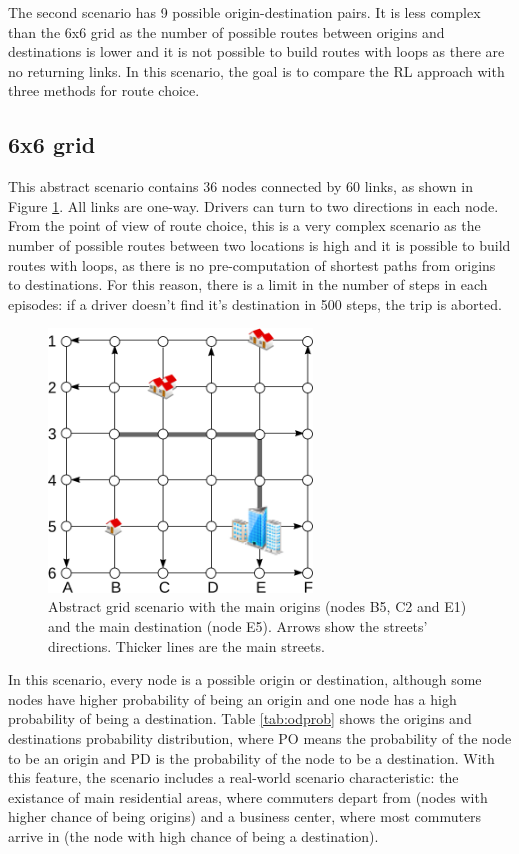 \documentclass{RITA}
\begin{document}
The second scenario has 9 possible origin-destination pairs. It is less complex than the 6x6 grid as the number of possible routes between origins and destinations is lower and it is not possible to build routes with loops as there are no returning links. In this scenario, the goal is to compare the RL approach with three methods for route choice.

\subsection{6x6 grid}

This abstract scenario contains 36 nodes connected by 60 links, as shown in Figure \ref{fig:6x6grid}. All links are one-way. Drivers can turn to two directions in each node. From the point of view of route choice, this is a very complex scenario as the number of possible routes between two locations is high and it is possible to build routes with loops, as there is no pre-computation of shortest paths from origins to destinations. For this reason, there is a limit in the number of steps in each episodes: if a driver doesn't find it's destination in 500 steps, the trip is aborted.

\begin{figure}[ht]
    \centerline{\includegraphics[width=7cm]{img/6x6grid.png}}
    \caption{Abstract grid scenario with the main origins (nodes B5, C2 and E1) and the main destination (node E5). Arrows show the streets' directions. Thicker lines are the main streets.}
    \label{fig:6x6grid}
\end{figure} 

In this scenario, every node is a possible origin or destination, although some nodes have higher probability of being an origin and one node has a high probability of being a destination. Table \ref{tab:odprob} shows the origins and destinations probability distribution, where PO means the probability of the node to be an origin and PD is the probability of the node to be a destination. With this feature, the scenario includes a real-world scenario characteristic: the existance of main residential areas, where commuters depart from (nodes with higher chance of being origins) and a business center, where most commuters arrive in (the node with high chance of being a destination).
\end{document}
